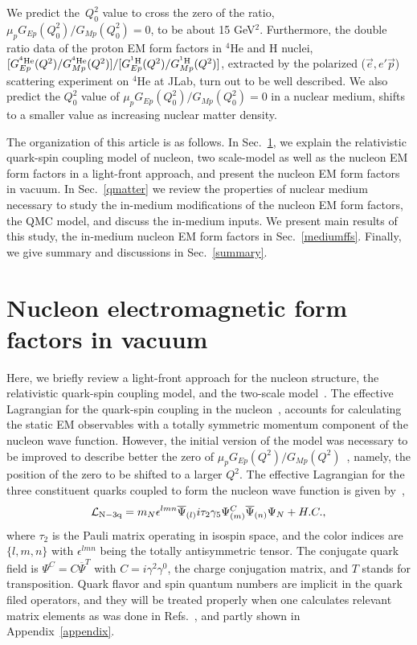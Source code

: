 \documentclass[preprint,aps,showpacs,floatfix]{revtex4}
\begin{document}
We predict the~$Q_0^2$ value to cross the zero  
of the ratio,  $\mu_p G_{Ep}(Q_0^2)/G_{Mp}(Q_0^2) = 0$,  
to be about 15 GeV$^2$. 
Furthermore, the double ratio data of the proton EM form factors 
in $^4$He and H nuclei, 
$[G^{^4{\rm He}}_{Ep}(Q^2)/G^{^4{\rm He}}_{Mp}(Q^2)]/[G^{^1{\rm H}}_{Ep}(Q^2)/G^{^1{\rm H}}_{Mp}(Q^2)]$, 
extracted by the polarized ($\vec{e}, e' \vec{p}$) 
scattering experiment on $^4$He at JLab, turn out to be well described. 
We also predict the $Q_0^2$ value of $\mu_pG_{Ep}(Q_0^2)/G_{Mp}(Q_0^2) = 0$  
in a nuclear medium, shifts to a smaller value as increasing nuclear matter density.

The organization of this article is as follows.
In Sec.~\ref{model}, we explain the relativistic quark-spin coupling 
model of nucleon, two scale-model as well as the nucleon EM form factors 
in a light-front approach, and present the nucleon EM form factors in vacuum. 
In Sec.~\ref{qmatter} we review the properties of nuclear medium necessary 
to study the in-medium modifications of the nucleon EM form factors, 
the QMC model, and discuss the in-medium inputs.
We present main results of this study, the in-medium nucleon EM 
form factors in Sec.~\ref{mediumffs}.
Finally, we give summary and discussions in Sec.~\ref{summary}. 



\section{Nucleon electromagnetic form factors in vacuum}
\label{model}

Here, we briefly review a light-front approach for the nucleon structure, the relativistic 
quark-spin coupling model, and the two-scale model~\cite{afsbw}.
The effective Lagrangian for the quark-spin coupling in
the nucleon~\cite{afsbw,Wilson2,Suisso,Araujo2004}, accounts for calculating the static EM
observables with a totally symmetric momentum component of the nucleon 
wave function. However, the initial version of the model was necessary to be improved to
describe better the zero of 
$\mu_p G_{Ep}(Q^2)/G_{Mp}(Q^2)$~\cite{Jones2000,Brash2002,Gayou2002,Punjabi2005,Ron2007,Puckett2010,Ron2011,Puckett2012},  
namely, the position of the zero to be shifted to a larger $Q^2$. 
The effective Lagrangian for the three constituent quarks  
coupled to form the nucleon wave function is given by~\cite{afsbw,Wilson2,Suisso,Araujo2004},
\begin{eqnarray}
{\cal{L}}_{\mathrm{N-3q}}=m_N\epsilon^{lmn}
\overline{\Psi}_{(l)} i\tau _2\gamma _5\Psi_{(m)}^C\overline{\Psi}
_{(n)}\Psi _N + H.C. , \label{lag}
\end{eqnarray}
where $\tau _2$ is the Pauli matrix operating in isospin space, and the color indices are
$\{l,m,n\}$ with $\epsilon^{lmn}$ being the totally antisymmetric
tensor. The conjugate quark field is $\Psi^C=C
\overline{\Psi}^T $ with $C=i \gamma^2\gamma^0$, the charge
conjugation matrix, and $T$ stands for transposition. 
Quark flavor and spin quantum numbers are implicit in the quark filed operators, and 
they will be treated properly when one calculates relevant matrix elements 
as was done in Refs.~\cite{afsbw,Wilson2,Suisso,Araujo2004}, and partly 
shown in Appendix~\ref{appendix}.
\end{document}
